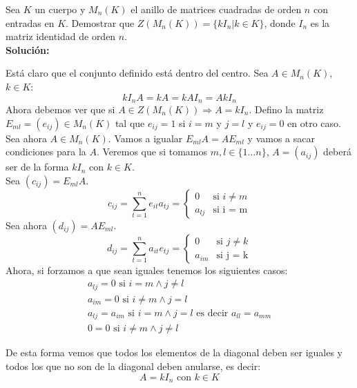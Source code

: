 \begin{ejercicio}
    Sea $K$ un cuerpo y $M_n(K)$ el anillo de matrices cuadradas de orden $n$ con entradas en $K$. Demostrar que $Z(M_n(K)) = \{kI_n | k \in K\}$, donde $I_n$ es la matriz identidad de orden $n$. \\

\noindent
\textbf{Solución:}

Está claro que el conjunto definido está dentro del centro. Sea $A \in M_n(K)$, $k \in K$:
\begin{equation*}
    kI_n A = kA = kAI_n = AkI_n
\end{equation*}
Ahora debemos ver que si $A \in Z(M_n(K)) \Longrightarrow A = kI_n$.
Defino la matriz $E_{ml} = (e_{ij}) \in M_n(K)$ tal que $e_{ij} = 1$ si $i = m$ y $j = l$ y $e_{ij} = 0$ en otro caso.
Sea ahora $A \in M_n(K)$. Vamos a igualar $E_{ml}A = AE_{ml}$ y vamos a sacar condiciones para la $A$. Veremos que si tomamos $m,l \in \{1\ldots n\}$, $A= (a_{ij})$ deberá ser de la forma $kI_n$ con $k \in K$. \\

\noindent
Sea $(c_{ij}) = E_{ml}A$.
\begin{equation*}
    c_{ij} = \sum_{t=1}^n e_{it}a_{tj} =  \left\{\begin{array}{ll}
        0 & \text{si\ } i \neq m \\
        a_{lj} & \text{si\ i = m} 
    \end{array}\right. 
\end{equation*}
Sea ahora $(d_{ij}) = AE_{ml}$.
\begin{equation*}
    d_{ij} = \sum_{t=1}^n a_{it}e_{tj} =  \left\{\begin{array}{ll}
        0 & \text{si\ } j \neq k \\
        a_{im} & \text{si\ j = k} 
    \end{array}\right. 
\end{equation*}
Ahora, si forzamos a que sean iguales tenemos los siguientes casos:
\begin{gather*}
    a_{lj} = 0 \text{\ si\ } i=m \land j\neq l\\
    a_{im} = 0 \text{\ si\ } i\neq m \land j=l \\
    a_{lj} = a_{im} \text{\ si\ } i=m \land j=l \text{\ es\ decir\ } a_{ll} = a_{mm} \\ 
    0 = 0 \text{\ si\ } i\neq m \land j\neq l
\end{gather*}

De esta forma vemos que todos los elementos de la diagonal deben ser iguales y todos los que no son de la diagonal deben anularse, es decir:
\begin{equation*}
    A = kI_n \text{\ con\ } k \in K
\end{equation*}

\end{ejercicio}

